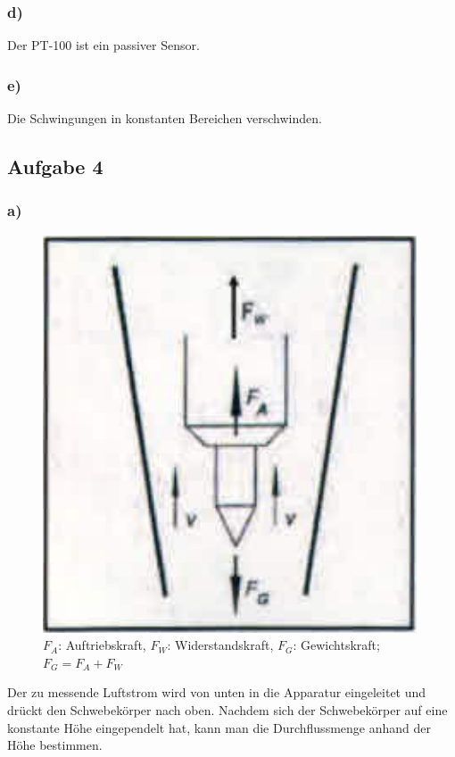 \subsubsection*{d)}

Der PT-100 ist ein passiver Sensor.


\subsubsection*{e)}

Die Schwingungen in konstanten Bereichen verschwinden.


\subsection{Aufgabe 4}

\subsubsection*{a)}

\begin{figure}[h]
\centering
\includegraphics[scale=0.6]{A2b.png}
\caption{$F_A$: Auftriebskraft, $F_W$: Widerstandskraft, $F_G$: Gewichtskraft; $F_G = F_A + F_W$}
\end{figure}

Der zu messende Luftstrom wird von unten in die Apparatur eingeleitet und drückt den Schwebekörper nach oben. Nachdem sich der Schwebekörper auf eine konstante Höhe eingependelt hat, kann man die Durchflussmenge anhand der Höhe bestimmen.

